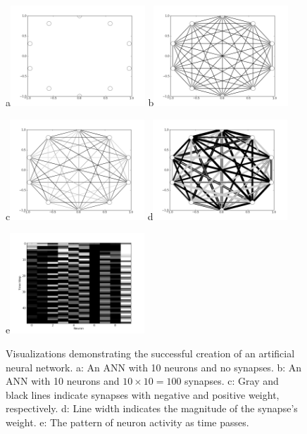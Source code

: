 \documentclass[12pt]{article}
\begin{document}
\begin{figure}[!t]
\centerline{
a\includegraphics[width=0.45\textwidth]{Fig1}
b\includegraphics[width=0.45\textwidth]{Fig2}
}
\centerline{
c\includegraphics[width=0.45\textwidth]{Fig3}
d\includegraphics[width=0.45\textwidth]{Fig4}
}
\centerline{
e\includegraphics[width=0.45\textwidth]{Fig5}
}
\caption{Visualizations demonstrating the successful creation of an artificial neural network.
a: An ANN with 10 neurons and no synapses.
b: An ANN with 10 neurons and $10 \times 10 = 100$ synapses.
c: Gray and black lines indicate synapses with negative and positive weight, respectively.
d: Line width indicates the magnitude of the synapse's weight.
e: The pattern of neuron activity as time passes.}
\label{Fig}
\end{figure}
\end{document}
